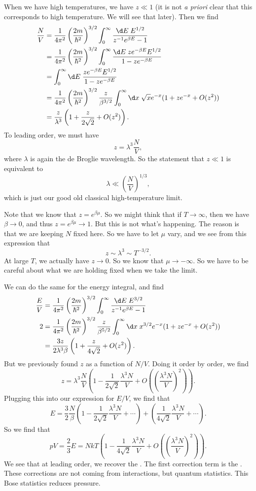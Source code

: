 \documentclass[a4paper]{article}
\begin{document}
When we have high temperatures, we have $z \ll 1$ (it is not \emph{a priori} clear that this corresponds to high temperature. We will see that later). Then we find
\begin{align*}
  \frac{N}{V} &= \frac{1}{4\pi^2} \left(\frac{2m}{\hbar^2}\right)^{3/2} \int_0^\infty \frac{\d E\; E^{1/2}}{z^{-1} e^{\beta E} - 1}\\
  &= \frac{1}{4\pi^2} \left(\frac{2m}{\hbar^2}\right)^{3/2} \int_0^\infty \frac{\d E\; ze^{-\beta E} E^{1/2}}{1 - z e^{-\beta E}}\\
  &= \int_0^\infty \d E\; \frac{z e^{-\beta E}E^{1/2}}{1 - z e^{-\beta E}}\\
  &= \frac{1}{4\pi^2} \left(\frac{2m}{\hbar^2}\right)^{3/2} \frac{z}{\beta^{3/2}} \int_0^\infty \d x\; \sqrt{x} e^{-x}(1 + ze^{-x} + O(z^2))\\
  &= \frac{z}{\lambda^3} \left(1 + \frac{z}{2\sqrt{2}} + O(z^2)\right).
\end{align*}
To leading order, we must have
\[
  z = \lambda^3 \frac{N}{V},
\]
where $\lambda$ is again the de Broglie wavelength. So the statement that $z \ll 1$ is equivalent to
\[
  \lambda \ll \left(\frac{N}{V}\right)^{1/3},
\]
which is just our good old classical high-temperature limit.

Note that we know that $z = e^{\beta\mu}$. So we might think that if $T \to \infty$, then we have $\beta \to 0$, and thus $z = e^{\beta \mu} \to 1$. But this is not what's happening. The reason is that we are keeping $N$ fixed here. So we have to let $\mu$ vary, and we see from this expression that
\[
  z \sim \lambda^3 \sim T^{-3/2}.
\]
At large $T$, we actually have $z \to 0$. So we know that $\mu \to -\infty$. So we have to be careful about what we are holding fixed when we take the limit.

We can do the same for the energy integral, and find
\begin{align*}
  \frac{E}{V} &= \frac{1}{4\pi^2} \left(\frac{2m}{\hbar^2}\right)^{3/2} \int_0^\infty \frac{\d E\; E^{3/2}}{z^{-1} e^{\beta E} - 1} \\
2 &= \frac{1}{4\pi^2} \left(\frac{2m}{\hbar^2}\right)^{3/2} \frac{z}{\beta^{5/2}} \int_0^\infty \d x\; x^{3/2} e^{-x}(1 + z e^{-x} + O(z^2))\\
  &= \frac{3z}{2\lambda^3 \beta}\left(1 + \frac{z}{4\sqrt{2}} + O(z^2)\right).
\end{align*}
But we previously found $z$ as a function of $N/V$. Doing it order by order, we find
\[
  z = \lambda^3\frac{N}{V} \left(1 - \frac{1}{2\sqrt{2}} \frac{\lambda^3 N}{V} + O\left(\left(\frac{\lambda^3 N}{V}\right)^2\right)\right).
\]
Plugging this into our expression for $E/V$, we find that
\[
  E = \frac{3}{2} \frac{N}{\beta}\left(1 - \frac{1}{2\sqrt{2}} \frac{\lambda^3N}{V} + \cdots\right) + \left(\frac{1}{4\sqrt{2}} \frac{\lambda^3 N}{V} + \cdots\right).
\]
So we find that
\[
  pV = \frac{2}{3}E = NkT \left(1 - \frac{1}{4\sqrt{2}} \frac{\lambda^3 N}{V} + O\left(\left(\frac{\lambda^3N}{V}\right)^2\right)\right).
\]
We see that at leading order, we recover the . The first correction term is the . These corrections are not coming from interactions, but quantum statistics. This Bose statistics reduces pressure.
\end{document}
